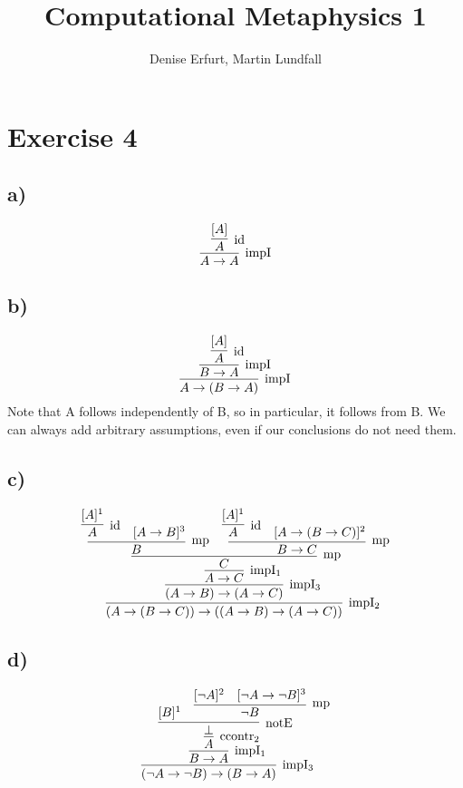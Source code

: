 \documentclass{article}
\begin{document}
\title{Computational Metaphysics 1}
\author{Denise Erfurt, Martin Lundfall}
\maketitle
\section*{Exercise 4}
\subsection*{a)}
\begin{equation}
  \infer[\mathrm{impI}]
        {A \rightarrow A}
        {\infer[\mathrm{id}]{A}{[A]}}        
\end{equation}
\subsection*{b)}
\begin{equation}
  \infer[\mathrm{impI}]
        {A \rightarrow (B \rightarrow A)}
        {\infer[\mathrm{impI}]
          {B \rightarrow A}
          {\infer[\mathrm{id}]
            {A}
            {[A]}
        }
   }
\end{equation}
Note that A follows independently of B, so in particular, it follows from B. We can always add arbitrary assumptions, even if our conclusions do not need them.
\subsection*{c)}
\begin{equation}
  \infer[\mathrm{impI_2}]
        {(A \rightarrow (B \rightarrow C)) \rightarrow ((A \rightarrow B) \rightarrow (A \rightarrow C))}
        {\infer[\mathrm{impI_3}]
          {(A \rightarrow B) \rightarrow (A \rightarrow C)}
          {\infer[\mathrm{impI_1}]
            {A \rightarrow C}
            {\infer[\mathrm{mp}]
              {C}
              {
                \infer[\mathrm{mp}]{B}{\infer[\mathrm{id}]{A}{[A]^1} & [A \rightarrow B]^3} &
                \infer[\mathrm{mp}]{B \rightarrow C}
                {\infer[\mathrm{id}]{A}{[A]^1} & [A \rightarrow (B \rightarrow C)]^2}
              }
            }
          }
        }
\end{equation}
\subsection*{d)}
\begin{equation}
  \infer[\mathrm{impI_3}]
        {( \neg A \rightarrow \neg B) \rightarrow (B \rightarrow A)}
        {\infer[\mathrm{impI_1}]
          {B \rightarrow A}
          {\infer[\mathrm{ccontr_2}]
            {A}
            {\infer[\mathrm{notE}]
              {\bot}
              {[B]^1 &
                \infer[\mathrm{mp}]
                      {\neg B}
                      {[\neg A]^2 & [\neg A \rightarrow \neg B]^3}
              }
            }
          }
        }
\end{equation}
\end{document}
